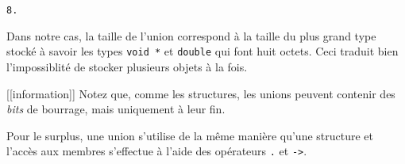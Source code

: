 \documentclass[]{article}
\newenvironment{Shaded}{}{}
\newcommand{\KeywordTok}[1]{\textcolor[rgb]{0.00,0.44,0.13}{\textbf{{#1}}}}
\newcommand{\DataTypeTok}[1]{\textcolor[rgb]{0.56,0.13,0.00}{{#1}}}
\newcommand{\DecValTok}[1]{\textcolor[rgb]{0.25,0.63,0.44}{{#1}}}
\newcommand{\SpecialCharTok}[1]{\textcolor[rgb]{0.25,0.44,0.63}{{#1}}}
\newcommand{\StringTok}[1]{\textcolor[rgb]{0.25,0.44,0.63}{{#1}}}
\newcommand{\ImportTok}[1]{{#1}}
\newcommand{\ControlFlowTok}[1]{\textcolor[rgb]{0.00,0.44,0.13}{\textbf{{#1}}}}
\newcommand{\PreprocessorTok}[1]{\textcolor[rgb]{0.74,0.48,0.00}{{#1}}}
\newcommand{\NormalTok}[1]{{#1}}
\begin{document}
\begin{Shaded}
\end{Shaded}

\begin{verbatim}
8.
\end{verbatim}

Dans notre cas, la taille de l'union correspond à la taille du plus
grand type stocké à savoir les types \texttt{void\ *} et \texttt{double}
qui font huit octets. Ceci traduit bien l'impossiblité de stocker
plusieurs objets à la fois.

{[}{[}information{]}{]} \textbar{} Notez que, comme les structures, les
unions peuvent contenir des \emph{bits} de bourrage, mais uniquement à
leur fin.

Pour le surplus, une union s'utilise de la même manière qu'une structure
et l'accès aux membres s'effectue à l'aide des opérateurs \texttt{.} et
\texttt{-\textgreater{}}.
\end{document}
